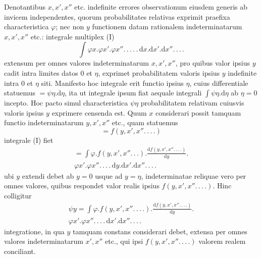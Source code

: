 Denotantibus \(x,x',x''\) etc. indefinite errores observationum eiusdem generis ab invicem independentes, quorum probabilitates relativas exprimit praefixa characteristica \(\varphi\); nec non \(y\) functionem datam rationalem indeterminatarum \(x,x',x''\) etc.: integrale multiplex (I)
\[
\int\varphi x.\varphi x'.\varphi x''\mathord{.}\,\mathord{.}\,\mathord{.}\,\mathord{.}\,\mathord{.}\,\mathrm{d}x.\mathrm{d}x'.\mathrm{d}x''\mathord{.}\,\mathord{.}\,\mathord{.}\,\mathord{.}
\]
extensum per omnes valores indeterminatarum \(x,x',x''\), pro quibus valor ipsius \(y\) cadit intra limites datos \(0\) et \(\eta\), exprimet probabilitatem valoris ipsius \(y\) indefinite intra \(0\) et \(\eta\) siti. Manifesto hoc integrale erit functio ipsius \(\eta\), cuius differentiale statuemus \(=\psi\eta.\mathrm{d}\eta\), ita ut integrale ipsum fiat aequale integrali \(\int\psi\eta.\mathrm{d}\eta\) ab \(\eta=0\) incepto. Hoc pacto simul characteristica \(\psi\eta\) probabilitatem relativam cuiusvis valoris ipsius \(y\) exprimere censenda est. Quum \(x\) considerari possit tamquam functio indeterminatarum \(y,x',x''\) etc., quam statuemus
\[
=f(y,x',x''\mathord{.}\,\mathord{.}\,\mathord{.}\,\mathord{.})
\]
integrale (I) fiet
\[
\begin{aligned}
=\int\varphi.f(y,x',x''\mathord{.}\,\mathord{.}\,\mathord{.}).\frac{\mathrm{d}f(y,x',x''\mathord{.}\,\mathord{.}\,\mathord{.}\,\mathord{.})}{\mathrm{d}y}.{}\\
\varphi x'.\varphi x''\mathord{.}\,\mathord{.}\,\mathord{.}\,\mathord{.}\,\mathrm{d}y.\mathrm{d}x'.\mathrm{d}x''\mathord{.}\,\mathord{.}\,\mathord{.}\,\mathord{.}
\end{aligned}
\]
ubi \(y\) extendi debet ab \(y=0\) usque ad \(y=\eta\), indeterminatae reliquae vero per omnes valores, quibus respondet valor realis ipsius \(f(y,x',x''\mathord{.}\,\mathord{.}\,\mathord{.}\,\mathord{.})\). Hinc colligitur
\[
\begin{aligned}
\psi y=\int\varphi.f(y,x',x''\mathord{.}\,\mathord{.}\,\mathord{.}\,\mathord{.}).\frac{\mathrm{d}f(y,x',x''\mathord{.}\,\mathord{.}\,\mathord{.}\,\mathord{.})}{\mathrm{d}y}.{}\\
\varphi x'.\varphi x''\mathord{.}\,\mathord{.}\,\mathord{.}\,\mathord{.}\,\mathrm{d}x'.\mathrm{d}x''\mathord{.}\,\mathord{.}\,\mathord{.}\,\mathord{.}
\end{aligned}
\]
integratione, in qua \(y\) tamquam constans considerari debet, extensa per omnes valores indeterminatarum \(x',x''\) etc., qui ipsi \(f(y,x',x''\mathord{.}\,\mathord{.}\,\mathord{.}\,\mathord{.})\) valorem realem conciliant.

